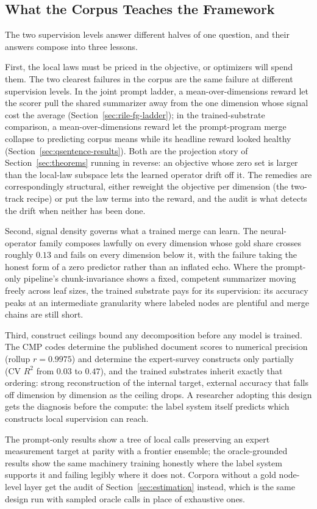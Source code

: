 \subsection{What the Corpus Teaches the Framework}\label{sec:manifesto-lessons}

The two supervision levels answer different halves of one question,
and their answers compose into three lessons.

First, the local laws must be priced in the objective, or optimizers
will spend them. The two clearest failures in the corpus are the same
failure at different supervision levels. In the joint prompt ladder,
a mean-over-dimensions reward let the scorer pull the shared
summarizer away from the one dimension whose signal cost the average
(Section~\ref{sec:rile-fg-ladder}); in the trained-substrate
comparison, a mean-over-dimensions reward let the prompt-program merge
collapse to predicting corpus means while its headline reward looked
healthy (Section~\ref{sec:qsentence-results}). Both are the projection
story of Section~\ref{sec:theorems} running in reverse: an objective
whose zero set is larger than the local-law subspace lets the learned
operator drift off it. The remedies are correspondingly structural,
either reweight the objective per dimension (the two-track recipe) or
put the law terms into the reward, and the audit is what detects the
drift when neither has been done.

Second, signal density governs what a trained merge can learn. The
neural-operator family composes lawfully on every dimension whose gold
share crosses roughly $0.13$ and fails on every dimension below it,
with the failure taking the honest form of a zero predictor rather
than an inflated echo. Where the prompt-only pipeline's
chunk-invariance shows a fixed, competent summarizer moving freely
across leaf sizes, the trained substrate pays for its supervision:
its accuracy peaks at an intermediate granularity where labeled nodes
are plentiful and merge chains are still short.

Third, construct ceilings bound any decomposition before any model is
trained. The CMP codes determine the published document scores to
numerical precision (rollup $r = 0.9975$) and determine the
expert-survey constructs only partially (CV $R^2$ from $0.03$ to
$0.47$), and the trained substrates inherit exactly that ordering:
strong reconstruction of the internal target, external accuracy that
falls off dimension by dimension as the ceiling drops. A researcher
adopting this design gets the diagnosis before the compute: the label
system itself predicts which constructs local supervision can reach.

The prompt-only results show a tree of local calls preserving an
expert measurement target at parity with a frontier ensemble; the
oracle-grounded results show the same machinery training honestly
where the label system supports it and failing legibly where it does
not. Corpora without a gold node-level layer get the audit of
Section~\ref{sec:estimation} instead, which is the same design run
with sampled oracle calls in place of exhaustive ones.
